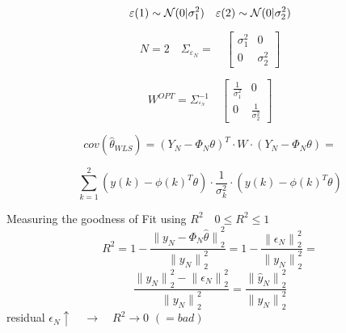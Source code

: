 \begin{tcolorbox}[colback=red!5!white,colframe=red!75!black,title=\textbf{Example LLS}]
\begin{equation*}
\varepsilon (1) \sim  { \cal{N} }(0|\sigma ^{ 2 }_{ 1 }) \quad \varepsilon (2) \sim  { \cal{N} }(0|\sigma ^{ 2 }_{ 2 })
\end{equation*}

\begin{equation*}
N=2 \quad { \Sigma  }_{ { \varepsilon  }_{ N } }=\quad \begin{bmatrix} \sigma _{ 1 }^{ 2 } & 0 \\ 0 & \sigma _{ 2 }^{ 2 } \end{bmatrix}
\end{equation*}

\begin{equation*}
W^{ OPT } = \Sigma _{ ^{ \varepsilon_{ N } } }^{ -1 }\quad \begin{bmatrix} \frac { 1 }{ \sigma _{ 1 }^{ 2 } }  & 0 \\ 0 & \frac { 1 }{ \sigma _{ 2 }^{ 2 } }  \end{bmatrix}
\end{equation*}

\begin{equation*}
cov({ \hat { \theta  } _{ WLS } }){ =({ Y }_{ N }-{ \Phi  }_{ N }\theta ) }^{ T }\cdot W\cdot ({ Y }_{ N }-{ \Phi  }_{ N }\theta )=
\end{equation*}

\begin{equation*}
\sum _{ k=1 }^{ 2 }{ (y(k)-{ \phi (k) }^{ T }\theta )\cdot \frac { 1 }{ { \sigma  }_{ k }^{ 2 } } \cdot (y(k)-{ \phi (k) }^{ T }\theta ) } 
\end{equation*}


Measuring the goodness of Fit using \({R}^{2} \quad 0\le {R}^{2} \le1\) 
\begin{equation*}
{ R }^{ 2 }=1-\frac { { \parallel { y }_{ N }-{ \Phi  }_{ N }\hat { \theta  } \parallel  }_{ 2 }^{ 2 } }{ { \parallel { y }_{ N }\parallel  }_{ 2 }^{ 2 } } =1-\frac { { \parallel { \epsilon  }_{ N }\parallel  }_{ 2 }^{ 2 } }{ { \parallel { y }_{ N }\parallel  }_{ 2 }^{ 2 } } =
\end{equation*}
\begin{equation*}
\frac { { \parallel { y }_{ N }\parallel  }_{ 2 }^{ 2 }-{ \parallel { \epsilon  }_{ N }\parallel  }_{ 2 }^{ 2 } }{ { \parallel { y }_{ N }\parallel  }_{ 2 }^{ 2 } } =\frac { { \parallel { \hat { y  }  }_{ N }\parallel  }_{ 2 }^{ 2 } }{ { \parallel { y }_{ N }\parallel  }_{ 2 }^{ 2 } } 
\end{equation*}
residual $ \epsilon_{N} \uparrow \quad \rightarrow \quad R^{2} \rightarrow 0 \,\,(= bad)$
\tcblower


\end{tcolorbox}
